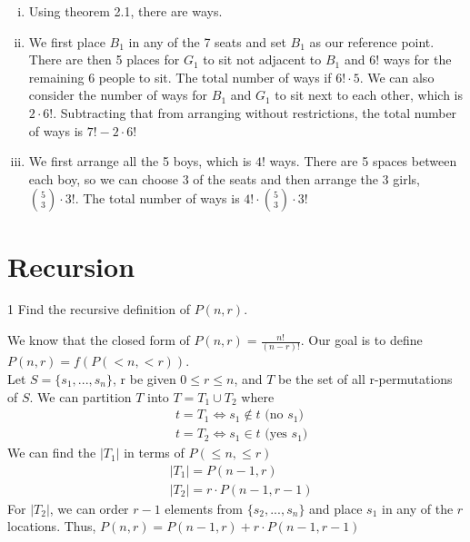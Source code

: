 \begin{solution}
    \begin{enumerate}[(i)]
        \item Using theorem 2.1, there are  ways.
        \item We first place $B_1$ in any of the 7 seats and set $B_1$ as our reference point. There are then 5 places for $G_1$ to sit not adjacent to $B_1$ and 6! ways for the remaining 6 people to sit. The total number of ways if $\boxed{6! \cdot 5}$. We can also consider the number of ways for $B_1$ and $G_1$ to sit next to each other, which is $2 \cdot 6!$. Subtracting that from arranging without restrictions, the total number of ways is $\boxed{7! - 2 \cdot 6!}$ 
        \item We first arrange all the 5 boys, which is $4!$ ways. There are 5 spaces between each boy, so we can choose 3 of the seats and then arrange the 3 girls, $\binom{5}{3} \cdot 3!$. The total number of ways is $\boxed{4! \cdot \binom{5}{3} \cdot 3!}$
    \end{enumerate}
\end{solution}
\section{Recursion}
\begin{exercise}
    1 Find the recursive definition of $P(n,r)$.
\end{exercise}

\begin{solution}
    We know that the closed form of $P(n,r) = \frac{n!}{(n-r)!}$. Our goal is to define $P(n, r) = f(P(<n, <r))$.\\
    Let $S = \{s_1, ..., s_n\}$, r be given $0 \leq r \leq n$, and $T$ be the set of all r-permutations of $S$.
    \noindent
    We can partition $T$ into $T = T_1 \cup T_2$ where
    \begin{align*}
        &t = T_1 \Leftrightarrow s_1 \notin t \text{ (no $s_1$)}\\
        &t = T_2 \Leftrightarrow s_1 \in t \text{ (yes $s_1$)}
    \end{align*}
    We can find the $|T_1|$ in terms of $P(\leq n, \leq r)$
    \begin{align*}
        &|T_1| = P(n-1, r)\\
        &|T_2| = r \cdot P(n-1, r-1) 
    \end{align*}
    For $|T_2|$, we can order $r-1$ elements from $\{s_2, ..., s_n \}$ and place $s_1$ in any of the $r$ locations. Thus, $\boxed{P(n,r) = P(n-1,r) + r \cdot P(n-1, r-1)}$
\end{solution}

